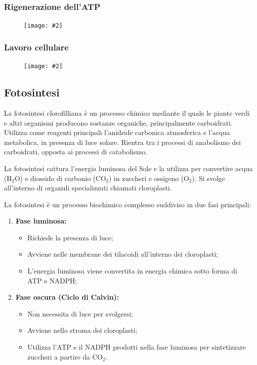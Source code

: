 \documentclass{article}
\newcommand{\cfig}[2]{
    \phantom{}
    \begin{figure}[ht!]
        \begin{center}
            \texttt{[image: \#2]}
        \end{center}
    \end{figure}
}
\begin{document}
\subsubsection{Rigenerazione dell'ATP}
\cfig{.7}{media/atp.png}

\subsubsection{Lavoro cellulare}
\cfig{.7}{media/lavoro-cellulare.png}

\subsection{Fotosintesi}
La fotosintesi clorofilliana è un processo chimico mediante il quale le piante verdi e altri
organismi producono sostanze organiche, principalmente carboidrati. Utilizza come reagenti
principali l'anidride carbonica atmosferica e l'acqua metabolica, in presenza di luce solare.
Rientra tra i processi di anabolismo dei carboidrati, opposta ai processi di catabolismo.

La fotosintesi cattura l'energia luminosa del Sole e la utilizza per convertire acqua (H$_2$O) e
diossido di carbonio (CO$_2$) in zuccheri e ossigeno (O$_2$). Si svolge all'interno di organuli
specializzati chiamati cloroplasti.

La fotosintesi è un processo biochimico complesso suddiviso in due fasi principali:
\begin{enumerate}
    \item \textbf{Fase luminosa:}
    \begin{itemize}
        \item Richiede la presenza di luce;
        \item Avviene nelle membrane dei tilacoidi all'interno dei cloroplasti;
        \item L'energia luminosa viene convertita in energia chimica sotto forma di ATP e NADPH;
    \end{itemize}
    \item \textbf{Fase oscura (Ciclo di Calvin):}
    \begin{itemize}
        \item Non necessita di luce per svolgersi;
        \item Avviene nello stroma dei cloroplasti;
        \item Utilizza l'ATP e il NADPH prodotti nella fase luminosa per sintetizzare zuccheri
            a partire da CO$_2$.
    \end{itemize}
\end{enumerate}
\end{document}

